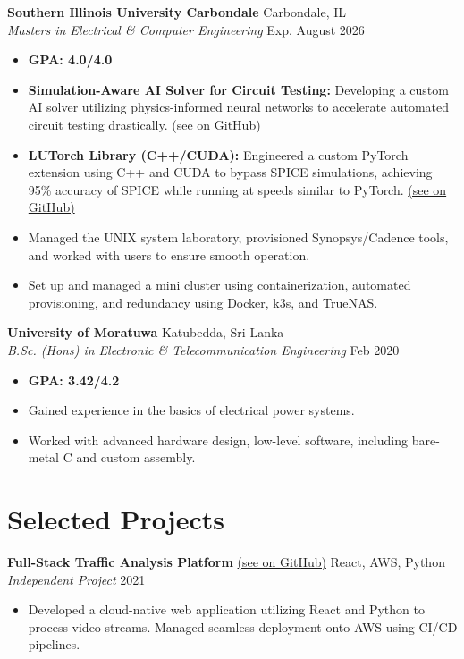 \documentclass[letterpaper,10pt]{article}
\begin{document}
\noindent \textbf{Southern Illinois University Carbondale} \hfill Carbondale, IL \\
\textit{Masters in Electrical \& Computer Engineering} \hfill Exp. August 2026
\begin{itemize}
    \item \textbf{GPA: 4.0/4.0}
    \item \textbf{Simulation-Aware AI Solver for Circuit Testing:} Developing a custom AI solver utilizing physics-informed neural networks to accelerate automated circuit testing drastically. \href{https://github.com/Jester-2-6/s-imply}{(see on GitHub)}
    \item \textbf{LUTorch Library (C++/CUDA):} Engineered a custom PyTorch extension using C++ and CUDA to bypass SPICE simulations, achieving 95\% accuracy of SPICE while running at speeds similar to PyTorch. \href{https://github.com/Jester-2-6/LUTorch}{(see on GitHub)}
    \item Managed the UNIX system laboratory, provisioned Synopsys/Cadence tools, and worked with users to ensure smooth operation.
    \item Set up and managed a mini cluster using containerization, automated provisioning, and redundancy using Docker, k3s, and TrueNAS.
\end{itemize}

\noindent \textbf{University of Moratuwa} \hfill Katubedda, Sri Lanka \\
\textit{B.Sc. (Hons) in Electronic \& Telecommunication Engineering} \hfill Feb 2020
\begin{itemize}
    \item \textbf{GPA: 3.42/4.2}
    \item Gained experience in the basics of electrical power systems.
    \item Worked with advanced hardware design, low-level software, including bare-metal C and custom assembly.
\end{itemize}

\section{Selected Projects}

\noindent \textbf{Full-Stack Traffic Analysis Platform} \href{https://github.com/abrutech/vision-traffic}{(see on GitHub)} \hfill React, AWS, Python \\
\textit{Independent Project} \hfill 2021
\begin{itemize}
    \item Developed a cloud-native web application utilizing React and Python to process video streams. Managed seamless deployment onto AWS using CI/CD pipelines.
\end{itemize}
\end{document}

